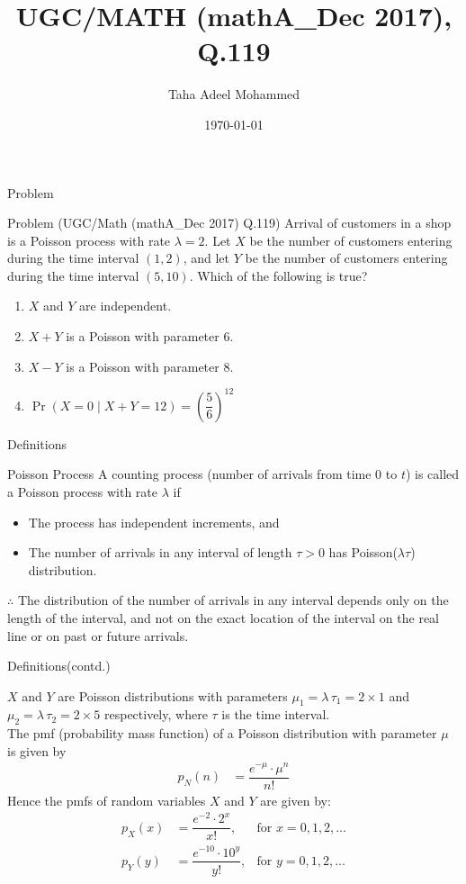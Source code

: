 \documentclass{beamer}
\title{UGC/MATH (mathA\_Dec 2017), Q.119}
\author{Taha Adeel Mohammed}
\institute{IITH(CSE)}
\date{\today}
\providecommand{\pr}[1]{\ensuremath{\Pr\left(#1\right)}}
\begin{document}
%
\begin{frame}
\titlepage
\end{frame}
\begin{frame}{Problem}
\begin{block}{Problem (UGC/Math (mathA\_Dec 2017) Q.119)}
Arrival of customers in a shop is a Poisson process with rate $\lambda =2$. Let $X$ be the number of customers entering during the time interval $(1,2)$, and let $Y$ be the number of customers entering during the time interval $(5,10)$. Which of the following is true?
\begin{enumerate}
    \item$X$ and $Y$ are independent.\\
    \item$X+Y$ is a Poisson with parameter $6$. \\
    \item$X-Y$ is a Poisson with parameter $8$.\\
    \item$\pr{X=0\mid X+Y=12}=\left(\dfrac{5}{6}\right)^{12}$
\end{enumerate}
\end{block}
\end{frame}
\begin{frame}{Definitions}
\begin{block}{Poisson Process}\label{poisson_process}
A counting process (number of arrivals from time $0$ to $t$) is called a Poisson process with rate $\lambda$ if
\begin{itemize}
    \item The process has independent increments, and
    \item The number of arrivals in any interval of length $\tau > 0$ has Poisson($\lambda \tau$) distribution.
\end{itemize}
$\therefore$ The distribution of the number of arrivals in any interval depends only on the length of the interval, and not on the exact location of the interval on the real line or on past or future arrivals.
\end{block}
\end{frame}
\begin{frame}{Definitions(contd.)}
   \begin{definition}
    $X$ and $Y$ are Poisson distributions with parameters $\mu_1 = \lambda \, \tau_1 = 2 \times 1$ and $\mu_2 = \lambda \, \tau_2 = 2 \times 5$ respectively, where $\tau$ is the time interval. \\
    The pmf (probability mass function) of a Poisson distribution with parameter $\mu$ is given by
    \begin{align}
        p_N(n) &= \dfrac{e^{-\mu}\cdot \mu^{n}}{n!}
    \end{align}
    Hence the pmfs of random variables $X$ and $Y$ are given by:
    \begin{align}
        p_X(x) &= \dfrac{e^{-2}\cdot 2^{x}}{x!}, & \text{for } x=0,1,2,\dots \label{pmf(X)}\\
        p_Y(y) &= \dfrac{e^{-10}\cdot 10^{y}}{y!}, & \text{for } y=0,1,2,\dots \label{pmf(Y)}
    \end{align}
\end{definition}
\end{frame}
\end{document}
